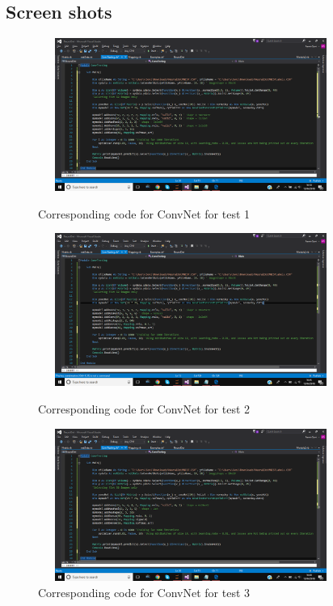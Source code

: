 \subsection{Screen shots}
\begin{figure}[H]
    \centering
    \includegraphics[width=10cm, height=5cm, trim = {0 6.8cm 0 0 }, clip]{Testing/ConvTests/ConvTest1.png}
    \caption{Corresponding code for ConvNet for test 1}
    \label{fig:ConvCodeT1}
    
    \includegraphics[width=10cm, height=5cm, trim = {0 6.8cm 0 0 }, clip]{Testing/ConvTests/ConvTest2.png}
    \caption{Corresponding code for ConvNet for test 2}
    \label{fig:ConvCodeT2}
    
    \includegraphics[width=10cm, height=5cm, trim = {0 6.8cm 0 0 }, clip]{Testing/ConvTests/ConvTest3.png}
    \caption{Corresponding code for ConvNet for test 3}
    \label{fig:ConvCodeT3}
\end{figure}

